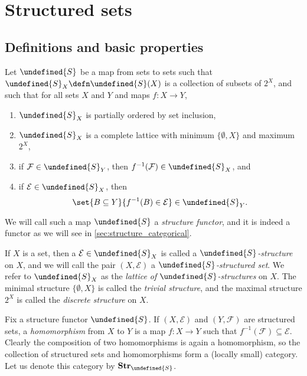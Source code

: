 \documentclass[article, a4paper, 11pt, oneside]{memoir}
\let\mathfrak\undefined
\numberwithin{equation}{chapter}
\newcommand{\calE}{\mathcal{E}}
\newcommand{\calF}{\mathcal{F}}
\newcommand{\strucS}{\mathfrak{S}}
\newcommand{\powerset}[1]{2^{#1}}
\newcommand{\ncat}[1]{\mathbf{#1}} %
\newcommand{\catStruc}[1]{\ncat{Str}_{#1}} %
\newcommand{\catStrucS}{\catStruc{\strucS}} %
\newcommand{\preim}{^{-1}}
\begin{document}
\chapter{Structured sets}


\section{Definitions and basic properties}

Let $\strucS$ be a map from sets to sets such that $\strucS_X \defn \strucS(X)$ is a collection of subsets of $\powerset{X}$, and such that for all sets $X$ and $Y$ and maps $f \colon X \to Y$,
%
\begin{enumerate}
    \item $\strucS_X$ is partially ordered by set inclusion,
    
    \item $\strucS_X$ is a complete lattice with minimum $\{\emptyset, X\}$ and maximum $2^X$,
    
    \item\label{enum:structure_def_pullback} if $\calF \in \strucS_Y$, then $f\preim(\calF) \in \strucS_X$, and
    
    \item\label{enum:structure_def_pushforward} if $\calE \in \strucS_X$, then
    \begin{equation*}
        \set{B \subseteq Y}{f\preim(B) \in \calE} \in \strucS_Y.
    \end{equation*}
\end{enumerate}
%
We will call such a map $\strucS$ a \emph{structure functor}, and it is indeed a functor as we will see in \cref{sec:structure_categorical}.

If $X$ is a set, then a $\calE \in \strucS_X$ is called a \emph{$\strucS$-structure} on $X$, and we will call the pair $(X, \calE)$ a \emph{$\strucS$-structured set}. We refer to $\strucS_X$ as the \emph{lattice of $\strucS$-structures} on $X$. The minimal structure $\{\emptyset, X\}$ is called the \emph{trivial structure}, and the maximal structure $\powerset{X}$ is called the \emph{discrete structure} on $X$.

Fix a structure functor $\strucS$. If $(X, \calE)$ and $(Y, \calF)$ are structured sets, a \emph{homomorphism} from $X$ to $Y$ is a map $f \colon X \to Y$ such that $f\preim(\calF) \subseteq \calE$. Clearly the composition of two homomorphisms is again a homomorphism, so the collection of structured sets and homomorphisms form a (locally small) category. Let us denote this category by $\catStrucS$.
\end{document}
